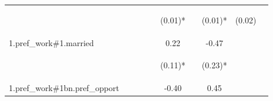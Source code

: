 \begin{center}
\begin{tabular}{lccccccccc}
 & \begin{footnotesize}\end{footnotesize} & \begin{footnotesize}\end{footnotesize} & \begin{footnotesize}\end{footnotesize} & \begin{footnotesize}\end{footnotesize} & \begin{footnotesize}(0.01)*\end{footnotesize} & \begin{footnotesize}\end{footnotesize} & \begin{footnotesize}(0.01)*\end{footnotesize} & \begin{footnotesize}(0.02)\end{footnotesize} & \begin{footnotesize}\end{footnotesize}\\
\noalign{\smallskip}1.pref_work\#1.married &  &  &  &  & 0.22 &  & -0.47 &  & \\
 & \begin{footnotesize}\end{footnotesize} & \begin{footnotesize}\end{footnotesize} & \begin{footnotesize}\end{footnotesize} & \begin{footnotesize}\end{footnotesize} & \begin{footnotesize}(0.11)*\end{footnotesize} & \begin{footnotesize}\end{footnotesize} & \begin{footnotesize}(0.23)*\end{footnotesize} & \begin{footnotesize}\end{footnotesize} & \begin{footnotesize}\end{footnotesize}\\
\noalign{\smallskip}1.pref_work\#1bn.pref_opport &  &  &  &  & -0.40 &  & 0.45 &  & \\

\end{tabular}
\end{center}

